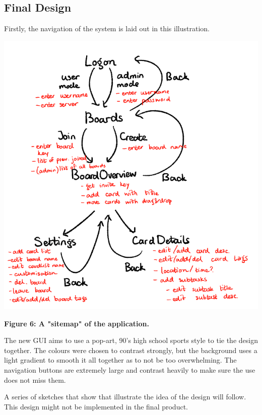 \subsection{Final Design}

Firstly, the navigation of the system is laid out in this illustration.

\includegraphics{mocks/hue_mock_flow.png}

\textbf{Figure 6: A "sitemap" of the application.}
\newline

The new GUI aims to use a pop-art, 90's high school sports style to tie the design together. The colours were chosen to contrast strongly, but the background uses a light gradient to smooth it all together as to not be too overwhelming. The navigation buttons are extremely large and contrast heavily to make sure the use does not miss them.

A series of sketches that show that illustrate the idea of the design will follow. This design might not be implemented in the final product. 

